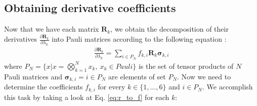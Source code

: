 \documentclass{aux/ttuthes2007}
\newcommand{\fpd}[2]{\frac{\partial #1}{\partial #2}}
\newcommand{\elec}{N}
\begin{document}
\subsection {\textbf{Obtaining derivative coefficients}}
%
Now that we have each matrix $\bm R_k$, we obtain the decomposition of their derivatives $\fpd{\bm R_k}{\lambda_k}$ into Pauli matrices according to the following equation \cite{benjamin}:
%
\begin{equation}\label{eq:r_to_f}
\begin{split}
	\fpd{\bm R_k}{\lambda_k} = \sum_{i \in P_\elec} f_{k, i} \bm R_k \bm \sigma_{k, i}
\end{split}
\end{equation}
%
where $P_\elec = \{x \vert x = \bigotimes_{k = 1}^{\elec} x_k,\ x_k \in Pauli\}$ is the set of tensor products of $\elec$ Pauli matrices and $ \bm \sigma_{k, i} = i \in P_\elec$ are elements of set $P_\elec$.
Now we need to determine the coefficients $f_{k, i}$ for every $k \in \{1, \ldots, 6\}$ and $i \in P_\elec$. We accomplish this task by taking a look at Eq. \ref{eq:r_to_f} for each $k$:
%
\end{document}
